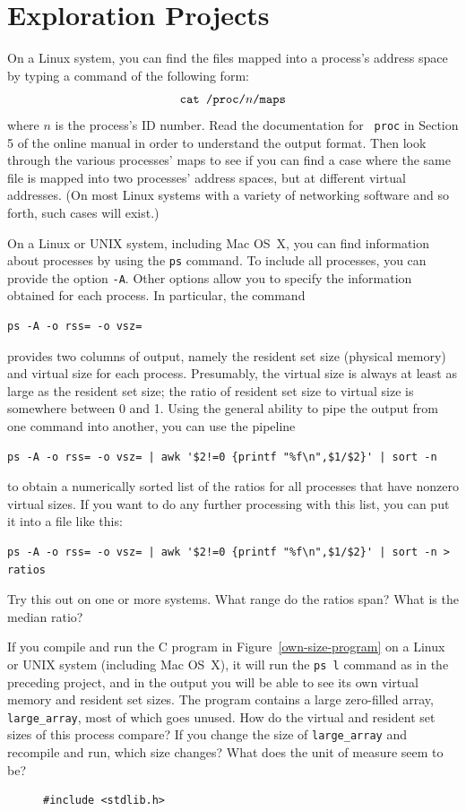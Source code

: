 \section*{Exploration Projects}
\begin{chapterEnumerate}
\item
\label{maps-exercise}
On a Linux system, you can find the files mapped into a process's
address space by typing a command of the following form:
\[\mbox{\tt cat /proc/}n\mbox{\tt /maps}\]
where $n$ is the process's ID number.  Read the documentation for {\tt
  proc} in Section 5 of the online manual in order to understand the
  output format.  Then look through the various processes' maps to
  see if you can find a case where the same file is mapped into two processes'
  address spaces, but at different virtual addresses.  (On most Linux
  systems with a variety of networking software and so forth, such cases will
  exist.)
\item
On a Linux or UNIX system, including Mac OS~X, you can find information about processes by
using the \verb|ps| command.  To include all processes, you can
provide the option \verb|-A|.
Other options allow you to specify the information obtained for each process.
In particular, the command
\begin{verbatim}
ps -A -o rss= -o vsz=
\end{verbatim}
provides two columns of output, namely the resident set size (physical memory) and virtual size for each process.
Presumably, the virtual size is always at least as large as
the resident set size; the ratio of resident set size to virtual
size is somewhere between 0 and 1.
Using the general ability to pipe the output from one command into another,
you can use the pipeline
\begin{verbatim}
ps -A -o rss= -o vsz= | awk '$2!=0 {printf "%f\n",$1/$2}' | sort -n
\end{verbatim}
to obtain a numerically sorted list of the ratios for all processes that have nonzero virtual sizes. If you want to do any further processing with this list, you can
put it into a file like this:
\begin{verbatim}
ps -A -o rss= -o vsz= | awk '$2!=0 {printf "%f\n",$1/$2}' | sort -n > ratios
\end{verbatim}
Try this out on one or more systems. What range do the ratios span?  What is
the median ratio?
\item
If you compile and run the C program in Figure~\ref{own-size-program} on a Linux or UNIX
system (including Mac OS~X), it will run the \verb|ps l| command as in the preceding
project, and in the output you will be able to see its own virtual
memory and resident set sizes.  The program contains a large
zero-filled array, \verb|large_array|, most of which goes unused.  How do the
virtual and resident set sizes of this process compare?  If you change
the size of \verb|large_array| and recompile and run, which size changes?  What does
the unit of measure seem to be?
\begin{figure}
\begin{verbatim}
#include <stdlib.h>


\end{verbatim}
\end{figure}
\end{chapterEnumerate}
